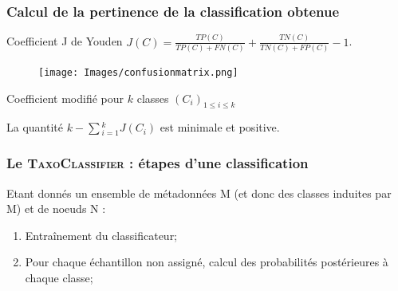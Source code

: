 \documentclass{beamer}
\begin{document}
\begin{frame}
\frametitle{Calcul de la pertinence de la classification obtenue}


\begin{block}{Coefficient J de Youden}
$J(C) = \frac{TP(C)}{TP(C) + FN(C)} + \frac{TN(C)}{TN(C) + FP(C)} - 1$.
\end{block}

\begin{figure}
\centering
\texttt{[image: Images/confusionmatrix.png]}
\end{figure}




\begin{block}{Coefficient \alert{modifié} pour $k$ classes $(C_{i})_{1 \le i \le k}$}
\begin{center}
La quantité $k - \sum{_{i = 1}^{k}}{J(C_{i})}$ est minimale et positive.
\end{center}
\end{block}

\end{frame}

\begin{frame}
\frametitle{Le \textsc{\bf TaxoClassifier} : étapes d'une classification}

Etant donnés un ensemble de métadonnées M (et donc des classes induites par M) et de noeuds N :
\bigskip
\begin{enumerate}
\item \alert{Entraînement} du classificateur;
\item Pour chaque échantillon non assigné, calcul des \alert{probabilités postérieures} à chaque classe;
\end{enumerate}
\end{frame}
\end{document}
